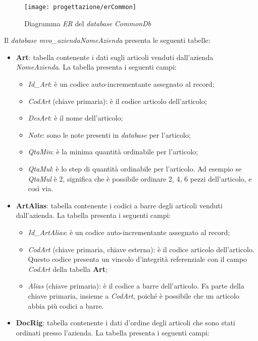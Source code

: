 \begin{figure}[!h] 
    \centering 
    \texttt{[image: progettazione/erCommon]} 
    \caption{Diagramma \textit{ER} del \textit{database} \textit{CommonDb}}
\end{figure}

\newpage

Il \textit{database} \textit{mvo\_aziendaNomeAzienda} presenta le seguenti tabelle:
\begin{itemize}
	\item \textbf{Art}: tabella contenente i dati sugli articoli venduti dall'azienda \textit{NomeAzienda}. La tabella presenta i seguenti campi:
		\begin{itemize}
			\item \textit{Id\_Art}: è un codice auto-incrementante assegnato al record;
			\item \textit{CodArt} (chiave primaria): è il codice articolo dell'articolo;
			\item \textit{DesArt}: è il nome dell'articolo;
			\item \textit{Note}: sono le note presenti in \textit{database} per l'articolo;
			\item \textit{QtaMin}: è la minima quantità ordinabile per l'articolo;
			\item \textit{QtaMul}: è lo step di quantità ordinabile per l'articolo. Ad esempio se \textit{QtaMul} è 2, significa che è possibile ordinare 2, 4, 6 pezzi dell'articolo, e così via.
		\end{itemize}
	\item \textbf{ArtAlias}: tabella contenente i codici a barre degli articoli venduti dall'azienda. La tabella presenta i seguenti campi:
		\begin{itemize}
			\item \textit{Id\_ArtAlias}: è un codice auto-incrementante assegnato al record;
			\item \textit{CodArt} (chiave primaria, chiave esterna): è il codice articolo dell'articolo. Questo codice presenta un vincolo d'integrità referenziale con il campo \textit{CodArt} della tabella \textbf{Art};
			\item \textit{Alias} (chiave primaria): è il codice a barre dell'articolo. Fa parte della chiave primaria, insieme a \textit{CodArt}, poiché è possibile che un articolo abbia più codici a barre.
		\end{itemize}
	\item \textbf{DocRig}: tabella contenente i dati d'ordine degli articoli che sono stati ordinati presso l'azienda. La tabella presenta i seguenti campi:

\end{itemize}
